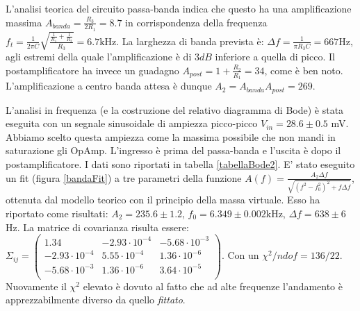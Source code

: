 \documentclass[10pt,a4paper]{article}
\begin{document}
L'analisi teorica del circuito passa-banda indica che questo ha una amplificazione massima $A_{banda} = \frac{R_3}{2 R_1} = 8.7$ in corrispondenza della frequenza $f_t = \frac{1}{2 \pi C} \sqrt{\frac{\frac{1}{R_1} + \frac{1}{R_2}}{R_3}} = 6.7 \mbox{kHz}$. %
La larghezza di banda prevista è: $\Delta f = \frac{1}{\pi R_3 C} = 667$Hz, agli estremi della quale l'amplificazione è di $3 dB$ inferiore a quella di picco. Il postamplificatore ha invece un guadagno $A_{post} = 1 + \frac{R_2}{R_1} = 34$, come è ben noto. L'amplificazione a centro banda attesa è dunque $A_{2} = A_{banda} A_{post} = 269$.

L'analisi in frequenza (e la costruzione del relativo diagramma di Bode) è stata eseguita con un segnale sinusoidale di ampiezza picco-picco $V_{in} = 28.6 \pm 0.5$ mV. Abbiamo scelto questa ampiezza come la massima possibile che non mandi in saturazione gli OpAmp. L'ingresso è prima del passa-banda e l'uscita è dopo il postamplificatore. I dati sono riportati in tabella \ref{tabellaBode2}.
E' stato eseguito un fit (figura \ref{bandaFit}) a tre parametri della funzione $A(f) = \frac{A_2 \Delta f}{\sqrt{(f^2-f_0^2)^2+f \Delta f}}$, ottenuta dal modello teorico con il principio della massa virtuale. Esso ha riportato come risultati: $A_2 = 235.6 \pm 1.2$, $f_0 = 6.349 \pm 0.002$kHz, $\Delta f = 638 \pm 6$Hz. La matrice di covarianza risulta essere: $ \Sigma_{ij} = \left( \begin{array}{ccc}
1.34 & -2.93 \cdot 10^{-4} & -5.68 \cdot 10^{-3}\\ 
-2.93 \cdot 10^{-4} & 5.55 \cdot 10^{-4} & 1.36 \cdot 10^{-6}\\
-5.68 \cdot 10^{-3} & 1.36 \cdot 10^{-6} & 3.64 \cdot 10^{-5}\\
\end{array} \right)$. Con un $\chi^2/ndof = 136/22$.\\
Nuovamente il $\chi^2$ elevato è dovuto al fatto che ad alte frequenze l'andamento è apprezzabilmente diverso da quello \emph{fittato}.

\end{document}
